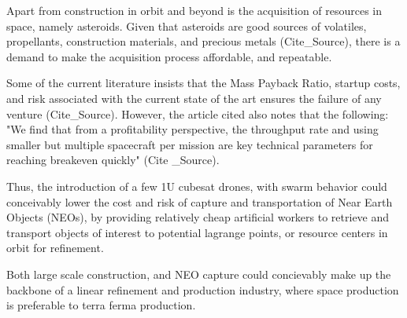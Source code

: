 Apart from construction in orbit and beyond is the acquisition of resources in space, namely asteroids. Given that asteroids are good sources of volatiles, propellants, construction materials, and precious metals (Cite_Source), there is a demand to make the acquisition process affordable, and repeatable.

Some of the current literature insists that the Mass Payback Ratio, startup costs, and risk associated with the current state of the art ensures the failure of any venture (Cite_Source). However, the article cited also notes that the following: "We find that from a profitability perspective, the throughput rate
and using smaller but multiple spacecraft per mission are key technical
parameters for reaching breakeven quickly" (Cite _Source).

Thus, the introduction of a few 1U cubesat drones, with swarm behavior could conceivably lower the cost and risk of capture and transportation of Near Earth Objects (NEOs), by providing relatively cheap artificial workers to retrieve and transport objects of interest to potential lagrange points, or resource centers in orbit for refinement.

Both large scale construction, and NEO capture could concievably make up the backbone of a linear refinement and production industry, where space production is preferable to terra ferma production.



